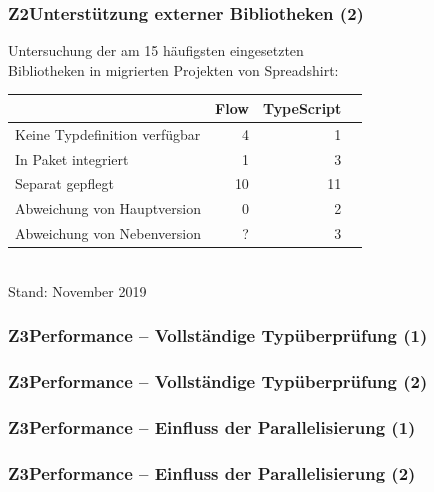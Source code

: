       \begin{frame}
        \frametitle{Z2\hspace{0.75em}Unterstützung externer Bibliotheken (2)}
        Untersuchung der am 15 häufigsten eingesetzten\\Bibliotheken in migrierten Projekten von Spreadshirt:\\[1.5em]

        {
          \footnotesize
          \begin{tabu} to 
            \midrule
            \rowfont{\bfseries}  {} & Flow & TypeScript \\
            \midrule
            Keine Typdefinition verfügbar &  4 &  1 \\
            In Paket integriert           &  1 &  3 \\
            Separat gepflegt              & 10 & 11 \\
            \midrule
            Abweichung von Hauptversion   &  0 &  2 \\
            Abweichung von Nebenversion   &  ? &  3 \\
            \midrule
          \end{tabu}
          \\[1em]
          Stand: November 2019
        }

      \end{frame}

      \begin{frame}
        \frametitle{Z3\hspace{0.75em}Performance -- Vollständige Typüberprüfung (1)}
        
      \end{frame}

      \begin{frame}
        \frametitle{Z3\hspace{0.75em}Performance -- Vollständige Typüberprüfung (2)}
        
      \end{frame}

      \begin{frame}
        \frametitle{Z3\hspace{0.75em}Performance -- Einfluss der Parallelisierung (1)}
        
      \end{frame}

      \begin{frame}
        \frametitle{Z3\hspace{0.75em}Performance -- Einfluss der Parallelisierung (2)}
        
      \end{frame}

